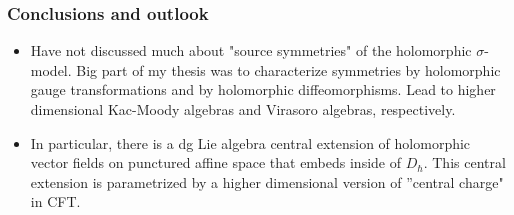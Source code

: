 \documentclass[10pt]{beamer}
\begin{document}
\begin{frame}
\frametitle{Conclusions and outlook}

\begin{itemize}
\item Have not discussed much about "source symmetries" of the holomorphic $\sigma$-model.
Big part of my thesis was to characterize symmetries by holomorphic gauge transformations and by holomorphic diffeomorphisms. 
Lead to higher dimensional Kac-Moody algebras and Virasoro algebras, respectively. 
\item In particular, there is a dg Lie algebra central extension of holomorphic vector fields on punctured affine space that embeds inside of $D_{\hbar}$. 
This central extension is parametrized by a higher dimensional version of ''central charge" in CFT. 
\end{itemize}
\end{frame}
\end{document}
